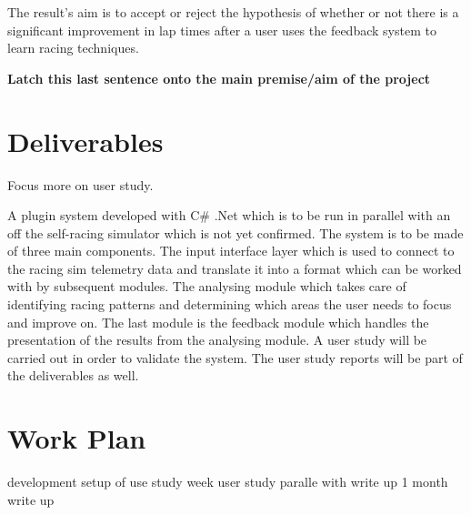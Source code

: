 \documentclass{article}
\begin{document}
The result’s aim is to accept or reject the hypothesis of whether or not there is a significant improvement in lap times after a user uses the feedback system to learn racing techniques. 

\textbf{Latch this last sentence onto the main premise/aim of the project}

\section{Deliverables} Focus more on user study.

A plugin system developed with C\# .Net which is to be run in parallel with an off the self-racing simulator which is not yet confirmed. The system is to be made of three main components. The input interface layer which is used to connect to the racing sim telemetry data and translate it into a format which can be worked with by subsequent modules. The analysing module which takes care of identifying racing patterns and determining which areas the user needs to focus and improve on. The last module is the feedback module which handles the presentation of the results from the analysing module.
A user study will be carried out in order to validate the system. The user study reports will be part of the deliverables as well.

\section{Work Plan}

development
setup of use study
week user study paralle with write up
1 month write up

\newpage
{}

\end{document}
